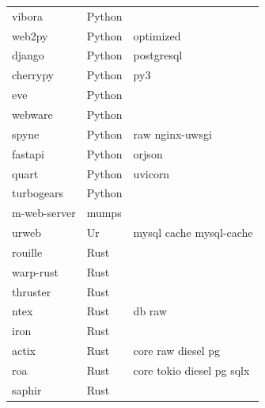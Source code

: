 \begin{longtable}{lll}
    vibora           & Python      &                                                    \\
    web2py           & Python      & optimized                                          \\
    django           & Python      & postgresql                                         \\
    cherrypy         & Python      & py3                                                \\
    eve              & Python      &                                                    \\
    webware          & Python      &                                                    \\
    spyne            & Python      & raw nginx-uwsgi                                    \\
    fastapi          & Python      & orjson                                             \\
    quart            & Python      & uvicorn                                            \\
    turbogears       & Python      &                                                    \\
    m-web-server     & mumps       &                                                    \\
    urweb            & Ur          & mysql cache mysql-cache                            \\
    rouille          & Rust        &                                                    \\
    warp-rust        & Rust        &                                                    \\
    thruster         & Rust        &                                                    \\
    ntex             & Rust        & db raw                                             \\
    iron             & Rust        &                                                    \\
    actix            & Rust        & core raw diesel pg                                 \\
    roa              & Rust        & core tokio diesel pg sqlx                          \\
    saphir           & Rust        &                                                    \\

\end{longtable}
